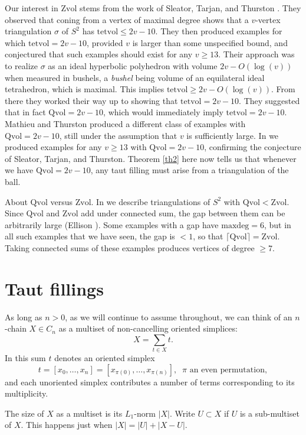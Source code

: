 \documentclass[12pt]{article}
\newcommand{\kw}{\mathrm}
\newcommand{\maxdeg}{\kw{maxdeg}}
\newcommand{\Zvol}{\kw{Zvol}}
\newcommand{\Qvol}{\kw{Qvol}}
\newcommand{\tetvol}{\kw{tetvol}}
\begin{document}
Our interest in $\Zvol$ stems from the work
of Sleator, Tarjan, and Thurston
\cite{stt:jams}.
They observed that coning from a vertex of maximal degree
shows that a $v$-vertex
triangulation $\sigma$
of $S^2$ has $\tetvol \leq 2v-10$.
They then
produced examples for which $\tetvol = 2v-10$, provided
$v$ is larger than some unspecified bound,
and conjectured that such examples should exist for any $v \geq 13$.
Their approach was to 
realize $\sigma$ as an ideal hyperbolic polyhedron
with volume $2v-O(\log(v))$ when measured in bushels,
a \emph{bushel} being volume of an equilateral ideal tetrahedron,
which is maximal.
This implies $\tetvol \geq 2v-O(\log(v))$.
From there they worked their way up to showing
that $\tetvol=2v-10$.
They suggested
\cite[p. 697]{stt:jams}
that in fact $\Qvol= 2v-10$,
which would immediately imply $\tetvol=2v-10$.
Mathieu and Thurston \cite{mt}
produced a different class of examples
with $\Qvol = 2v-10$, still under the assumption that $v$
is sufficiently large.
In \cite{dew:filling} we produced examples for any $v \geq 13$ with
$\Qvol=2v-10$, confirming the conjecture of Sleator, Tarjan, and Thurston.
Theorem \ref{th2} here now
tells us that whenever we have $\Qvol=2v-10$, any taut filling
must arise from a triangulation of the ball.

About $\Qvol$ versus $\Zvol$.
In \cite{dew:filling}
we describe triangulations of $S^2$ with $\Qvol < \Zvol$.
Since $\Qvol$ and $\Zvol$
add under connected sum, the gap between them can be arbitrarily
large
(Ellison \cite{ellison:gap}).
Some examples with a gap have $\maxdeg =6$,
but in all such examples that we have seen,
the gap is $<1$, so that
$\lceil \Qvol \rceil = \Zvol$.
Taking connected sums of these examples
produces vertices of degree $\geq 7$.


\section{Taut fillings}

As long as $n>0$,
as we will continue to assume throughout,
we can think of an $n$-chain $X \in C_n$ as a multiset of
non-cancelling oriented simplices:
\[
X = \sum_{t \in X} t
.
\]
In this sum $t$ denotes an oriented simplex
\[
t=[x_0,\ldots,x_n]
= [x_{\pi(0)},\ldots,x_{\pi(n)}]
,\;\;\mbox{$\pi$ an even permutation}
,
\]
and each unoriented simplex contributes a number of terms corresponding
to its multiplicity.

The size of $X$ as a multiset is its $L_1$-norm $|X|$.
Write $U \subset X$
if $U$ is a sub-multiset of $X$.
This happens just when
$|X| = |U| + |X-U|$.
\end{document}

